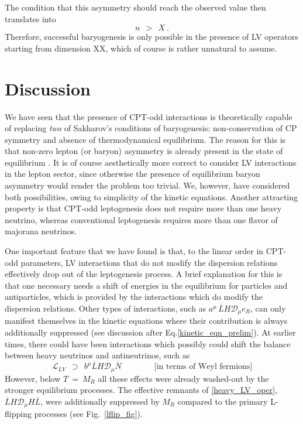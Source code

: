 \documentclass[12pt]{revtex4}
\newcommand{\md}{\mathcal{D}}
\newcommand{\ov}{\overline}
\begin{document}
	The condition that this asymmetry should reach the observed value then translates
	into
\[
	n~~>~~X~.
\]
	Therefore, successful baryogenesis is only possible in the presence of LV operators
	starting from dimension XX, which of course is rather 
	unnatural to assume.


%
%
\section{Discussion}

	We have seen that the presence of CPT-odd interactions is theoretically capable
	of replacing \emph{two} of Sakharov's conditions of baryogenesis: non-conservation 
	of CP symmetry and absence of thermodynamical equilibrium.
	The reason for this is that non-zero lepton (or baryon) asymmetry is already present 
	in the state of equilibrium
\cite{Dolgov:1981hv}.
	It is of course aesthetically more correct to consider LV interactions in the 
	lepton sector,
	since otherwise the presence of equilibrium baryon asymmetry would render the 
	problem too trivial.
	We, however, have considered both possibilities, owing to  simplicity of the kinetic
	equations.
	Another attracting property is that CPT-odd leptogenesis does not require more than
	one heavy neutrino, whereas conventional leptogenesis requires more than one flavor
	of majorana neutrinos.

	One important feature that we have found is that, to the linear order in CPT-odd 
	parameters, LV interactions that do not modify the dispersion relations effectively 
	drop out of the leptogenesis process.
	A brief explanation for this is that one necessary needs a shift of energies
	in the equilibrium for particles and antiparticles, which is provided by the 
	interactions which do modify the dispersion relations. 
	Other types of interactions, such as $ a^\mu\, \ov{L}H \md_\mu e_R $,
	can only manifest themselves in the kinetic equations where their contribution
	is always additionally suppressed 
	(see discussion after Eq.\eqref{kinetic_eqn_prelim}).
	At earlier times, there could have been interactions which possibly could 
	shift the balance between heavy neutrinos and antineutrinos, such as 
\begin{equation}
\label{heavy_LV_oper}
	\mathcal{L}_{LV} ~~\supset~~
	 b^\mu \ov{L} H \md_\mu \ov{N} \qquad\qquad \text{[in terms of Weyl fermions]}
\end{equation}
	However, below $ T ~=~ M_R $ all these effects
	were already washed-out by the stronger equilibrium processes.
	The effective remnants of \eqref{heavy_LV_oper}, $ \ov{L}H \md_\mu H \ov{L} $, 
	were additionally suppressed by $ M_R $ compared to the primary L-flipping processes
	(see Fig.~\ref{lflip_fig}).
	
\end{document}
